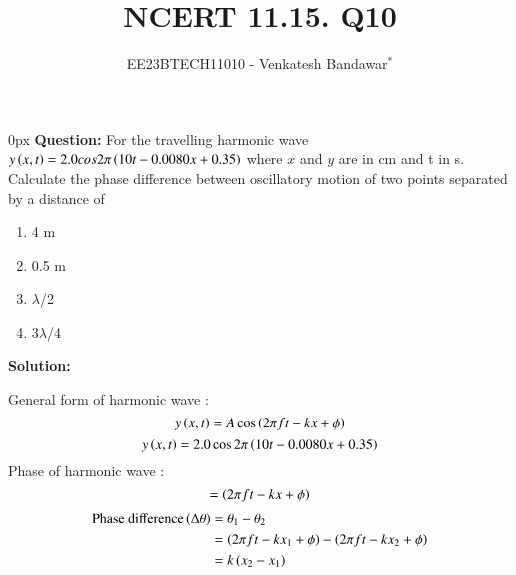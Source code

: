 \documentclass[journal,12pt,twocolumn]{IEEEtran}
\theoremstyle{remark}
\begin{document}

\vspace{3cm}

\title{NCERT 11.15. Q10}
\author{EE23BTECH11010 - Venkatesh Bandawar$^{*}$%
}
\maketitle
\newpage
\bigskip

\renewcommand{\thefigure}{\theenumi}
\renewcommand{\thetable}{\theenumi}



\parindent 0px
\textbf{Question:} For the travelling harmonic wave
$y\left(x, t\right) = 2.0 cos 2\pi \left(10t - 0.0080 x + 0.35\right)$ where $x$ and $y$ are in cm and t in s. Calculate the phase difference between oscillatory
motion of two points separated by a distance of 

\begin{enumerate} [label=(\alph*)]
    \item 4 m
    \item 0.5 m
    \item $\lambda$/2
    \item 3$\lambda$/4
\end{enumerate}

\textbf{Solution:}  
\begin{table}[htbp] \small
\centering

\end{table}

 General form of harmonic wave :
\begin{equation}
    y\left(x, t\right) = A \cos \left(2\pi f t - k x + \phi\right)
\end{equation}
\begin{equation}
    y\left(x, t\right) = 2.0 \cos 2\pi \left(10t - 0.0080 x + 0.35\right)
\end{equation}
Phase of harmonic wave :
\begin{equation}
    = \left(2\pi f t - k x + \phi\right)
\end{equation}
\begin{align}
    \text{Phase difference} \left(\Delta \theta\right)&= \theta_1 - \theta_2 \\
    &= \left( 2\pi f t - kx_1 + \phi\right) - \left(2\pi f t -kx_2 + \phi\right)\\
    &= k\left(x_2 - x_1\right) \label{equation for phase difference}
\end{align}

\begin{table}[htbp] \small
\centering

\end{table}
\end{document}
